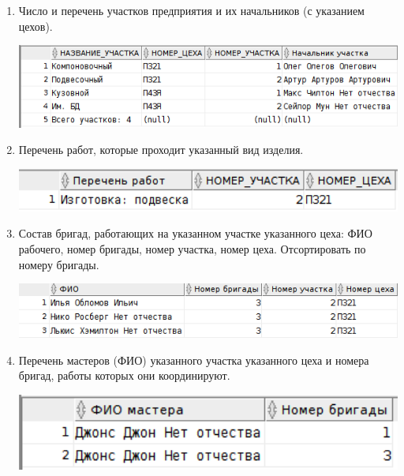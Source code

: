 \begin{enumerate}
    \item Число и перечень участков предприятия и их начальников (с указанием цехов).

    

    \includegraphics[width=16cm]{./screenshots/results/result4.png}

    \item Перечень работ, которые проходит указанный вид изделия.

    

    \includegraphics[width=16cm]{./screenshots/results/result5.png}

    \item Состав бригад, работающих на указанном участке указанного цеха: ФИО рабочего, номер бригады, номер участка, номер цеха. Отсортировать по номеру бригады.

    

    \includegraphics[width=16cm]{./screenshots/results/result6.png}

    \item Перечень мастеров (ФИО) указанного участка указанного цеха и номера бригад, работы которых они координируют.

    

    \includegraphics[width=16cm]{./screenshots/results/result7.png}


\end{enumerate}
